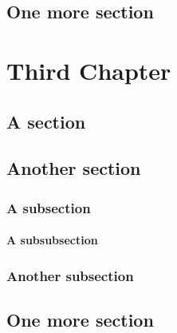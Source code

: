 \documentclass[12pt]{ucalgthes1}
\begin{document}
\section{One more section}
\chapter{Third Chapter}
\section{A section}
\section{Another section}
\subsection{A subsection}
\subsubsection{A subsubsection}
\subsection{Another subsection}
\section{One more section}
%
%
%
%
%
\appendix



\nocite{*}

\end{document}
